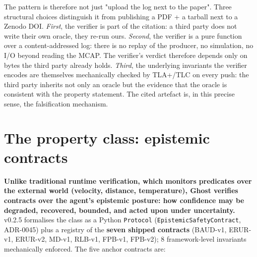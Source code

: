 \documentclass[11pt,a4paper]{article}
\begin{document}
The pattern is therefore not just "upload the log next to the
paper". Three structural choices distinguish it from publishing a
PDF + a tarball next to a Zenodo DOI. \emph{First}, the verifier
is part of the citation: a third party does not write their own
oracle, they re-run ours. \emph{Second}, the verifier is a pure
function over a content-addressed log: there is no replay of the
producer, no simulation, no I/O beyond reading the MCAP. The
verifier's verdict therefore depends only on bytes the third party
already holds. \emph{Third}, the underlying invariants the
verifier encodes are themselves mechanically checked by TLA+/TLC
on every push: the third party inherits not only an oracle but the
evidence that the oracle is consistent with the property
statement. The cited artefact is, in this precise sense, the
falsification mechanism.

\section{The property class: epistemic contracts}
\label{sec:properties}

\textbf{Unlike traditional runtime verification, which monitors
predicates over the external world (velocity, distance,
temperature), Ghost verifies contracts over the agent's epistemic
posture: how confidence may be degraded, recovered, bounded, and
acted upon under uncertainty.} v0.2.5 formalises the class as a
Python \texttt{Protocol} (\texttt{EpistemicSafetyContract},
ADR-0045) plus a registry of the \textbf{seven shipped
contracts} (BAUD-v1, ERUR-v1, ERUR-v2, MD-v1, RLB-v1, FPB-v1,
FPB-v2); 8 framework-level invariants mechanically enforced. The
five anchor contracts are:
\end{document}
